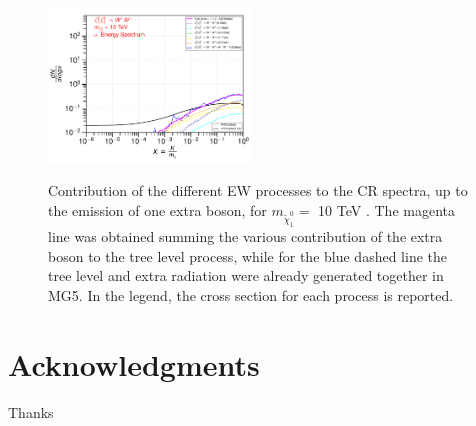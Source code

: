 \documentclass[epj,nopacs,fleqn]{svjour}
\begin{document}
\begin{figure}[!h]
	\subfigure
	{\includegraphics[width=0.48\textwidth]{Fig/n1ww_comparison/10000_neutrinos_tau_n1ww_comparison.pdf} }
	
	\caption{Contribution of the different EW processes to the CR spectra, up to the emission of one extra boson, for $m_{\tilde \chi_1 ^0}=$ 10 TeV . The magenta line was obtained summing the various contribution of the extra boson to the tree level process, while for the blue dashed line the tree level and extra radiation were already generated together in MG5. In the legend, the cross section for each process is reported.}
	\label{ew_comparison_10}
\end{figure}





\clearpage
\section*{Acknowledgments}
Thanks
%


\end{document}
